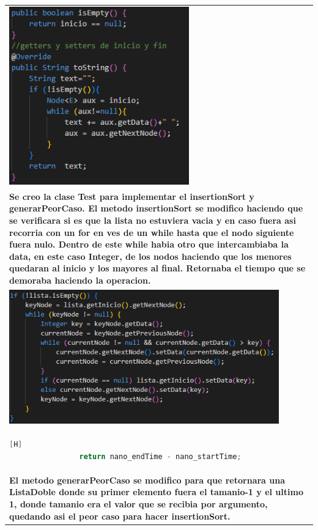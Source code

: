 \documentclass[9pt]{article}
\begin{document}
\begin{longtable}{|p{15cm}|}
			\includegraphics[width=0.6\textwidth,keepaspectratio]{img/otros.png}\\
			\textbf{Se creo la clase Test  para implementar el insertionSort y generarPeorCaso.
			El metodo insertionSort se modifico haciendo que se verificara si es que 
			la lista no estuviera vacia y en caso fuera asi recorria con un 
			for en ves de un while hasta que el nodo siguiente fuera nulo. Dentro de este while
			habia otro que intercambiaba la data, en este caso Integer, de los nodos
			haciendo que los menores quedaran al inicio y los mayores al final. Retornaba
			el tiempo que se demoraba haciendo la operacion.}\\
			\includegraphics[width=0.9\textwidth,keepaspectratio]{img/insertionSort.png}\\
			\begin{lstlisting}[language=Java,caption={Retorno de insertionSort}][H]
				return nano_endTime - nano_startTime;
			\end{lstlisting}\\
			\textbf{El metodo generarPeorCaso se modifico para que retornara una ListaDoble donde su
			primer elemento fuera el tamanio-1 y el ultimo 1, donde tamanio era el valor que 
			se recibia por argumento, quedando asi el peor caso para hacer insertionSort.}\\

\end{longtable}
\end{document}
